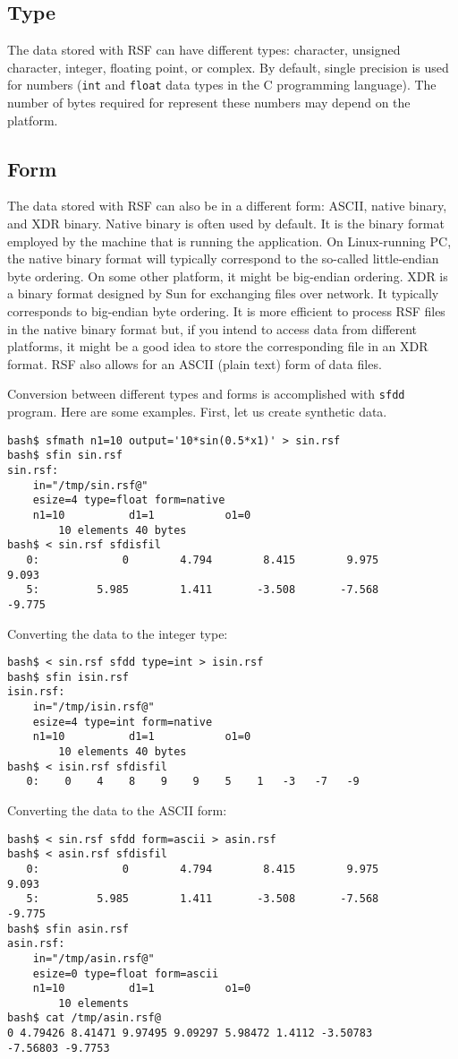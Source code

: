 \subsection{Type}

The data stored with RSF can have different types: character, unsigned
character, integer, floating point, or complex. By default, single precision
is used for numbers (\texttt{int} and \texttt{float} data types in the C
programming language). The number of bytes required for represent these
numbers may depend on the platform.

\subsection{Form}

The data stored with RSF can also be in a different form: ASCII, native
binary, and XDR binary. Native binary is often used by default. It is the
binary format employed by the machine that is running the application. On
Linux-running PC, the native binary format will typically correspond to the
so-called little-endian byte ordering. On some other platform, it might be
big-endian ordering. XDR is a binary format designed by Sun for exchanging
files over network. It typically corresponds to big-endian byte ordering. It
is more efficient to process RSF files in the native binary format but, if you
intend to access data from different platforms, it might be a good idea to
store the corresponding file in an XDR format. RSF also allows for an ASCII
(plain text) form of data files. 

Conversion between different types and forms is accomplished with
\texttt{sfdd} program. Here are some examples. First, let us create synthetic
data.
\begin{verbatim}
bash$ sfmath n1=10 output='10*sin(0.5*x1)' > sin.rsf
bash$ sfin sin.rsf
sin.rsf:
    in="/tmp/sin.rsf@"
    esize=4 type=float form=native
    n1=10          d1=1           o1=0
        10 elements 40 bytes
bash$ < sin.rsf sfdisfil
   0:             0        4.794        8.415        9.975        9.093
   5:         5.985        1.411       -3.508       -7.568       -9.775
\end{verbatim}
Converting the data to the integer type:
\begin{verbatim}
bash$ < sin.rsf sfdd type=int > isin.rsf
bash$ sfin isin.rsf
isin.rsf:
    in="/tmp/isin.rsf@"
    esize=4 type=int form=native
    n1=10          d1=1           o1=0
        10 elements 40 bytes
bash$ < isin.rsf sfdisfil
   0:    0    4    8    9    9    5    1   -3   -7   -9
\end{verbatim}
Converting the data to the ASCII form:
\begin{verbatim}
bash$ < sin.rsf sfdd form=ascii > asin.rsf
bash$ < asin.rsf sfdisfil
   0:             0        4.794        8.415        9.975        9.093
   5:         5.985        1.411       -3.508       -7.568       -9.775
bash$ sfin asin.rsf
asin.rsf:
    in="/tmp/asin.rsf@"
    esize=0 type=float form=ascii
    n1=10          d1=1           o1=0
        10 elements
bash$ cat /tmp/asin.rsf@
0 4.79426 8.41471 9.97495 9.09297 5.98472 1.4112 -3.50783
-7.56803 -9.7753
\end{verbatim}

